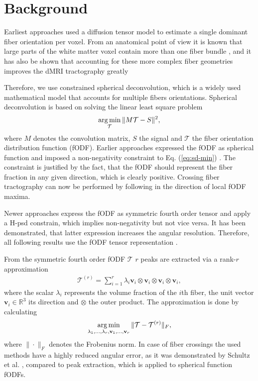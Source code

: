 \section{Background}\label{background}
Earliest approaches used a diffusion tensor model
\cite{LeBihan:1986,Mori:1999} to estimate a single dominant fiber orientation
per voxel. From an anatomical point of view it is known that large parts of the
white matter voxel contain more than one fiber bundle \cite{Jeurissen:2012}, and it has also be shown
that accounting for these more complex fiber geometries improves the dMRI
tractography greatly \cite{Neher:2015}

Therefore, we use constrained spherical deconvolution, which is a widely used
mathematical model that accounts for multiple fibers orientations.
Spherical deconvolution is based on solving the linear least square problem 
\begin{align}
	\operatorname*{arg\,min}_{\mathcal{T}} \| M \mathcal{T} - S \|^2,
	\label{eq:sd-min}
\end{align}
where 
$M$ denotes the convolution matrix, $S$ the signal and $\mathcal{T}$ the fiber
orientation distribution function (fODF).
Earlier approaches expressed the fODF as spherical function and imposed a
non-negativity constraint to Eq. (\ref{eq:sd-min}) \cite{TOURNIER20071459}. The
constraint is justified by
the fact, that the fODF should represent the fiber fraction in any given
direction, which is clearly positive. Crossing fiber tractography can now be
performed by following in the direction of local fODF maxima.

Newer approaches express the fODF as symmetric fourth order tensor and apply a
H-psd constrain, which implies non-negativity but not vice versa. It has been
demonstrated, that latter expression increases the angular resolution.
Therefore, all following results use the fODF tensor representation
\cite{Ankele:CARS2017}. 

From the symmetric fourth order fODF $\mathcal{T}$ $r$ peaks are extracted via a rank-$r$
approximation 
\begin{align}
	\mathcal{T}^{\left( r \right)} = \sum_{i=1}^r \lambda_i \mathbf{v}_i
	\otimes \mathbf{v}_i \otimes \mathbf{v}_i \otimes \mathbf{v}_i, 
	\label{eq:low-rank}
\end{align}
where the scalar $\lambda_i$ represents the volume fraction of the $i$th fiber,
the unit vector $\mathbf{v}_i \in \mathbb{R}^3$ its direction and $\otimes$ the
outer product. The approximation is done by calculating 
\[ \operatorname*{arg\,min}_{\lambda_1, \dots , \lambda_r , \mathbf{v}_1, \dots , \mathbf{v}_r}
\| \mathcal{T} - \mathcal{T}^{\left( r \right)} \|_F, \]
where $\| \cdot \|_F$ denotes the Frobenius norm. In case of fiber crossings the
used methods have a highly reduced angular error, as it was demonstrated by
Schultz et al. \cite{lowrank}, compared to peak extraction, which is applied to spherical function fODFs.

